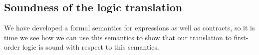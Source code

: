 


\subsection{Soundness of the logic translation}  \label{s:soundness}

We have developed a formal semantics for expressions as well as contracts, so it is time we
see how we can use this semantics to show that our translation to first-order logic is sound
with respect to this semantics.

